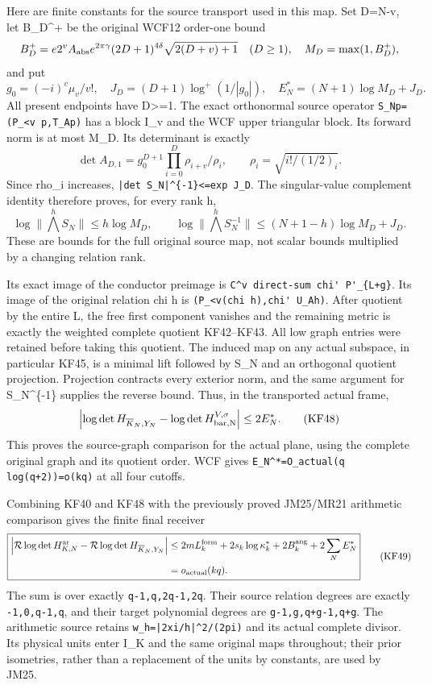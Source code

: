 \documentclass[11pt]{article}
\begin{document}
Here are finite constants for the source transport used in this map. Set D=N-v, let B\_D\^{}+ be the original WCF12 order-one bound \[
B_D^+=e2^v A_{\rm abs}e^{2\pi\gamma}(2D+1)^{4\delta}
\sqrt{2(D+v)+1}\quad(D\ge1),\quad M_D=\max(1,B_D^+),
\] and put \[
g_0=(-i)^v\mu_v/v!,\quad J_D=(D+1)\log^+(1/|g_0|),\quad
E_N^*= (N+1)\log M_D+J_D.
\tag{KF46}
\] All present endpoints have D\textgreater=1. The exact orthonormal source operator \nolinkurl{S_Np=(P_<v p,T_Ap)} has a block I\_v and the WCF upper triangular block. Its forward norm is at most M\_D. Its determinant is exactly \[
\det A_{D,1}=g_0^{D+1}\prod_{i=0}^D\rho_{i+v}/\rho_i,
\qquad \rho_i=\sqrt{i!/(1/2)_i}.
\] Since rho\_i increases, \nolinkurl{|det S_N|^{-1}<=exp J_D}. The singular-value complement identity therefore proves, for every rank h, \[
\log\|\bigwedge^h S_N\|\le h\log M_D,\qquad
\log\|\bigwedge^hS_N^{-1}\|\le(N+1-h)\log M_D+J_D.
\tag{KF47}
\] These are bounds for the full original source map, not scalar bounds multiplied by a changing relation rank.

Its exact image of the conductor preimage is \nolinkurl{C^v direct-sum chi' P'_{L+g}}. Its image of the original relation chi h is \nolinkurl{(P_<v(chi h),chi' U_Ah)}. After quotient by the entire L, the free first component vanishes and the remaining metric is exactly the weighted complete quotient KF42--KF43. All low graph entries were retained before taking this quotient. The induced map on any actual subspace, in particular KF45, is a minimal lift followed by S\_N and an orthogonal quotient projection. Projection contracts every exterior norm, and the same argument for S\_N\^{}\{-1\} supplies the reverse bound. Thus, in the transported actual frame, \[
\left|\log\det H_{\overline K_N,Y_N}
-\log\det H_{\rm bar,N}^{V,\sigma}\right|\le2E_N^*.
\tag{KF48}
\] This proves the source-graph comparison for the actual plane, using the complete original graph and its quotient order. WCF gives \nolinkurl{E_N^*=O_actual(q log(q+2))=o(kq)} at all four cutoffs.

Combining KF40 and KF48 with the previously proved JM25/MR21 arithmetic comparison gives the finite final receiver \[
\boxed{\begin{aligned}
\left|\mathcal R\log\det H_{K,N}^{\rm ar}
-\mathcal R\log\det H_{\overline K_N,Y_N}\right|
\le{}&2mL_k^{\rm form}+2s_k\log\kappa_k^*
+2B_k^{\rm ang}+2\sum_N E_N^*\\
={}&o_{\rm actual}(kq).
\end{aligned}}
\tag{KF49}
\] The sum is over exactly \texttt{q-1,q,2q-1,2q}. Their source relation degrees are exactly \texttt{-1,0,q-1,q}, and their target polynomial degrees are \texttt{g-1,g,q+g-1,q+g}. The arithmetic source retains \nolinkurl{w_h=|2xi/h|^2/(2pi)} and its actual complete divisor. Its physical units enter I\_K and the same original maps throughout; their prior isometries, rather than a replacement of the units by constants, are used by JM25.
\end{document}
